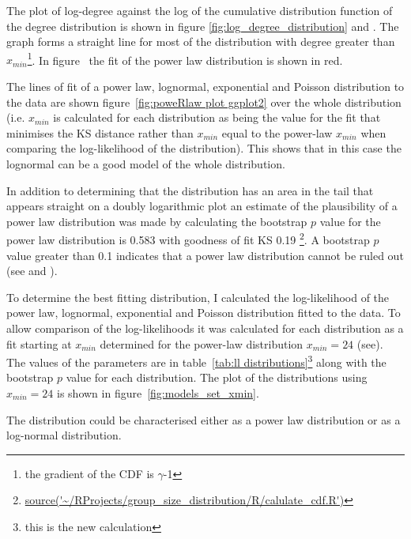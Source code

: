 The plot of log-degree against the log of the cumulative distribution function of the degree distribution is shown in figure \ref{fig:log_degree_distribution} and  \label{fig:poweRlaw plot ggplot2}. The graph forms a straight line for most of the distribution with degree greater than $x_{min}$\footnote{the gradient of the CDF is $\gamma$-1}. In figure~\label{fig:poweRlaw plot ggplot2} the fit of the power law distribution is shown in red. 

The lines of fit of a power law, lognormal, exponential and Poisson distribution to the data are shown figure~\ref{fig:poweRlaw plot ggplot2} over the whole distribution (i.e. $x_{min}$ is calculated for each distribution as being the value for the fit that minimises the KS distance rather than $x_{min}$ equal to the power-law $x_{min}$ when comparing the log-likelihood of the distribution). This shows that in this case the lognormal can be a good model of the whole distribution.

In addition to determining that the distribution has an area in the tail that appears straight on a doubly logarithmic plot an estimate of the plausibility of a power law distribution was made by calculating the bootstrap $p$ value for the power law distribution is 0.583 with goodness of fit KS 0.19 \footnote{\url{source('~/RProjects/group_size_distribution/R/calulate_cdf.R')}}. A bootstrap $p$ value greater than 0.1 indicates that a power law distribution cannot be ruled out (see \cite{gillespie2015fitting} and \cite{clauset2009power}).



To determine the best fitting distribution, I calculated the log-likelihood of the power law, lognormal, exponential and Poisson distribution fitted to the data. To allow comparison of the log-likelihoods it was calculated for each distribution as a fit starting at $x_{min}$ determined for the power-law distribution $x_{min} = 24$ (see\cite{clauset2009power}). The values of the parameters are in table~\ref{tab:ll distributions}\footnote{this is the new calculation} along with the bootstrap $p$ value for each distribution. The plot of the distributions using $x_{min}=24$ is shown in figure~\ref{fig:models_set_xmin}.

The distribution could be characterised either as a power law distribution or as a log-normal distribution.







